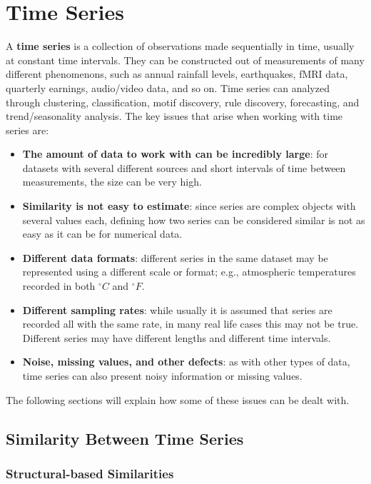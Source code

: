 \chapter{Time Series}

A \textbf{time series} is a collection of observations made sequentially in time, usually at constant time intervals. They can be constructed out of measurements of many different phenomenons, such as annual rainfall levels, earthquakes, fMRI data, quarterly earnings, audio/video data, and so on. Time series can analyzed through clustering, classification, motif discovery, rule discovery, forecasting, and trend/seasonality analysis. The key issues that arise when working with time series are:
\begin{itemize}
    \item \textbf{The amount of data to work with can be incredibly large}: for datasets with several different sources and short intervals of time between measurements, the size can be very high.

    \item \textbf{Similarity is not easy to estimate}: since series are complex objects with several values each, defining how two series can be considered similar is not as easy as it can be for numerical data.

    \item \textbf{Different data formats}: different series in the same dataset may be represented using a different scale or format; e.g., atmospheric temperatures recorded in both $^{\circ}C$ and $^{\circ}F$.

    \item \textbf{Different sampling rates}: while usually it is assumed that series are recorded all with the same rate, in many real life cases this may not be true. Different series may have different lengths and different time intervals.

    \item \textbf{Noise, missing values, and other defects}: as with other types of data, time series can also present noisy information or missing values.
\end{itemize}
The following sections will explain how some of these issues can be dealt with.

\section{Similarity Between Time Series}

\subsection{Structural-based Similarities}

